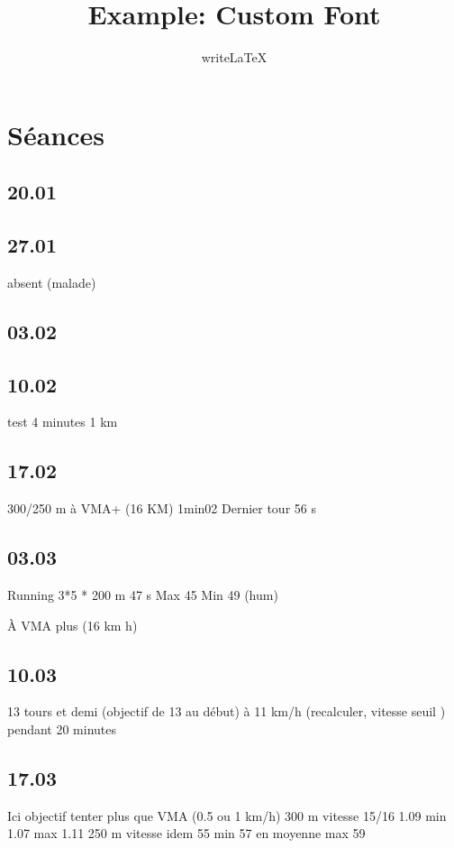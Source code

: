 \documentclass{article}
\title{Example: Custom Font}
\author{writeLaTeX}
\begin{document}
\maketitle

\section{Séances}
    \subsection{20.01}
    
    
    \subsection{27.01}
        absent (malade)
    
    
    \subsection{03.02}
    
    
    \subsection{10.02}
        test 4 minutes 1 km
    
    
    \subsection{17.02}
        300/250 m à VMA+ (16 KM)
        1min02
        Dernier tour 56 s
    
    
    \subsection{03.03}
        Running 3*5 * 200 m
        47 s
        Max 45 
        Min 49 (hum)
        
        À VMA plus (16 km h)
        
        
    \subsection{10.03}
        13 tours et demi (objectif de 13 au début)
        à 11 km/h (recalculer, vitesse seuil ) pendant 20 minutes
    
    
    \subsection{17.03}
        Ici objectif tenter plus que VMA (0.5 ou 1 km/h)
        300 m vitesse 15/16
        1.09 min 1.07 max 1.11
        250 m vitesse idem
        55 min 57 en moyenne max 59
        
\end{document}

